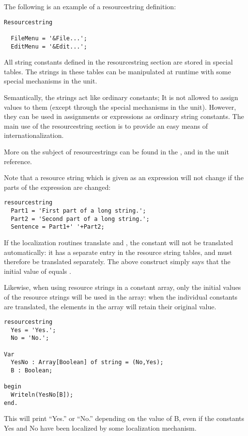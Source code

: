 The following is an example of a resourcestring definition:
\begin{verbatim}
Resourcestring

  FileMenu = '&File...';
  EditMenu = '&Edit...';
\end{verbatim}
All string constants defined in the resourcestring section are stored
in special tables. The strings in these tables can be manipulated
at runtime with some special mechanisms in the  unit.

Semantically, the strings act like ordinary constants; It is not allowed
to assign values to them (except through the special mechanisms in the
 unit). However, they can be used in assignments or expressions as
ordinary string constants. The main use of the resourcestring section is
to provide an easy means of internationalization.

More on the subject of resourcestrings can be found in the \progref, and
in the  unit reference.

\begin{remark}
Note that a resource string which is given as an expression will not change if
the parts of the expression are changed:
\begin{verbatim}
resourcestring
  Part1 = 'First part of a long string.';
  Part2 = 'Second part of a long string.';
  Sentence = Part1+' '+Part2;
\end{verbatim}
If the localization routines translate  and , the
 constant will not be translated automatically: it has a
separate entry in the resource string tables, and must therefore be
translated separately. The above construct simply says that the
initial value of  equals .
\end{remark}

\begin{remark}
Likewise, when using resource strings in a constant array, only the initial
values of the resource strings will be used in the array: when the
individual constants are translated, the elements in the array will retain
their original value.
\begin{verbatim}
resourcestring
  Yes = 'Yes.';
  No = 'No.';

Var
  YesNo : Array[Boolean] of string = (No,Yes);
  B : Boolean;

begin
  Writeln(YesNo[B]);
end.
\end{verbatim}
This will print ``Yes.'' or ``No.'' depending on the value of B, even if the
constants Yes and No have been localized by some localization mechanism.
\end{remark}


